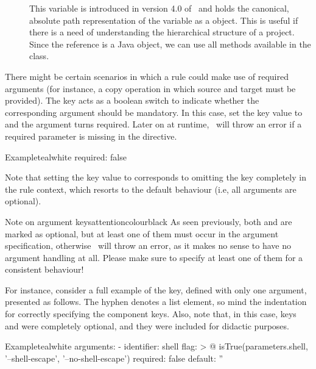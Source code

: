 \begin{description}
\begin{description}
\begin{description}
\item[] This variable is introduced in version 4.0 of \arara\ and holds the canonical, absolute path representation of the  variable as a  object. This is useful if there is a need of understanding the hierarchical structure of a project. Since the reference is a Java object, we can use all methods available in the  class.
\end{description}

\item[\describecontext{O}{arguments}{required}] There might be certain scenarios in which a rule could make use of required arguments (for instance, a copy operation in which source and target must be provided). The  key acts as a boolean switch to indicate whether the corresponding argument should be mandatory. In this case, set the key value to  and the argument turns required. Later on at runtime, \arara\ will throw an error if a required parameter is missing in the directive.

\begin{codebox}{Example}{teal}{\icnote}{white}
required: false
\end{codebox}

Note that setting the  key value to  corresponds to omitting the key completely in the rule context, which resorts to the default behaviour (i.e, all arguments are optional).
\end{description}

\begin{messagebox}{Note on argument keys}{attentioncolour}{\icattention}{black}
As seen previously, both  and  are marked as optional, but at least one of them must occur in the argument specification, otherwise \arara\ will throw an error, as it makes no sense to have no argument handling at all. Please make sure to specify at least one of them for a consistent behaviour!
\end{messagebox}

For instance, consider a full example of the  key, defined with only one argument, presented as follows. The hyphen denotes a list element, so mind the indentation for correctly specifying the component keys. Also, note that, in this case, keys  and  were completely optional, and they were included for didactic purposes.

\begin{codebox}{Example}{teal}{\icnote}{white}
arguments:
- identifier: shell
  flag: >
    @{
        isTrue(parameters.shell,
               '--shell-escape',
               '--no-shell-escape')
    }
  required: false
  default: ''
\end{codebox}
\end{description}

